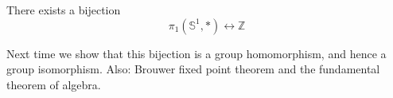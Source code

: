 \begin{corollary}
  \label{cor:S1_Z_bij}
    There exists a bijection
    \[
      \pi_1(\mathbb{S}^1, *) \leftrightarrow \mathbb{Z}
    \]
\end{corollary}

Next time we show that this bijection
is a group homomorphism, and
hence a group isomorphism.
Also: Brouwer fixed point theorem
and the fundamental theorem of algebra.

